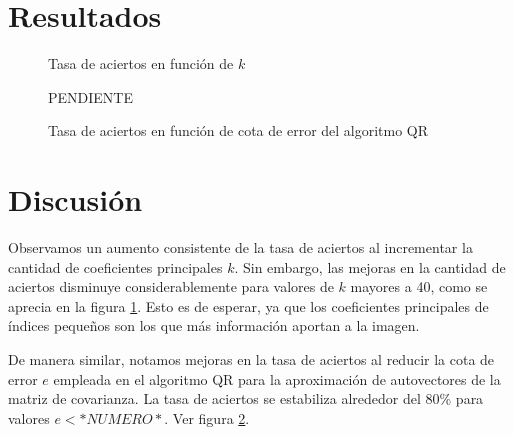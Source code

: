 \documentclass[a4paper,10pt,twoside]{article}
\begin{document}




\section{Resultados}


\begin{figure}[H]
  \centering
  
  \caption{Tasa de aciertos en función de $k$}
  \label{tasas-vs-k}
\end{figure}


\begin{figure}[H]
  \centering
  PENDIENTE
  \caption{Tasa de aciertos en función de cota de error del algoritmo QR}
  \label{tasas-vs-cota}
\end{figure}





\section{Discusión}

Observamos un aumento consistente de la tasa de aciertos al incrementar la cantidad de coeficientes principales $k$. Sin embargo, las mejoras en la cantidad de aciertos disminuye considerablemente para valores de $k$ mayores a 40, como se aprecia en la figura \ref{tasas-vs-k}. Esto es de esperar, ya que los coeficientes principales de índices pequeños son los que más información aportan a la imagen.

De manera similar, notamos mejoras en la tasa de aciertos al reducir la cota de error $e$ empleada en el algoritmo QR para la aproximación de autovectores de la matriz de covarianza. La tasa de aciertos se estabiliza alrededor del 80\% para valores $e < *NUMERO*$. Ver figura \ref{tasas-vs-cota}.
\end{document}
